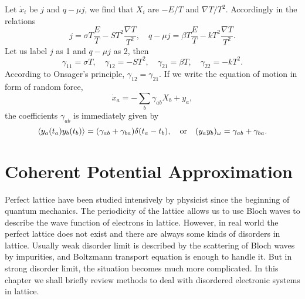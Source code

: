\documentclass{book}
\newcommand{\average}[1]{\langle#1\rangle}
\numberwithin{equation}{section}
\begin{document}
Let $\dot{x}_i$ be $j$ and $q-\mu j$, we find that $X_i$ are $-E/T$
and $\nabla T/T^2$. Accordingly in the relations
\begin{equation}
  j=\sigma T\frac{E}{T}-ST^2\frac{\nabla T}{T^2},\quad
  q-\mu j=\beta T\frac{E}{T}-kT^2\frac{\nabla T}{T^2}.
\end{equation}
Let us label $j$ as 1 and $q-\mu j$ as 2, then
\begin{equation}
  \gamma_{11}=\sigma T,\quad \gamma_{12}=-ST^2,\quad
  \gamma_{21}=\beta T,\quad \gamma_{22}=-kT^2.
\end{equation}
According to Onsager's principle, $\gamma_{12}=\gamma_{21}$.  If we
write the equation of motion in form of random force, 
\begin{equation}
  \dot{x}_a=-\sum_b\gamma_{ab}X_b+y_a,
\end{equation}
the coefficients $\gamma_{ab}$ is immediately given by
\begin{equation}
  \average{y_a(t_a)y_b(t_b)}=(\gamma_{ab}+\gamma_{ba})\delta(t_a-t_b),\quad
  {\rm or}\quad(y_ay_b)_\omega=\gamma_{ab}+\gamma_{ba}.
\end{equation}

\chapter{Coherent Potential Approximation}
Perfect lattice have been studied intensively by physicist since the
beginning of quantum mechanics. The periodicity of the lattice allows
us to use Bloch waves to describe the wave function of electrons in
lattice. However, in real world the perfect lattice does not exist and
there are always some kinds of disorders in lattice. Usually weak
disorder limit is described by the scattering of Bloch waves by
impurities, and Boltzmann transport equation is enough to handle
it. But in strong disorder limit, the situation becomes much more
complicated. In this chapter we shall briefly review methods to deal
with disordered electronic systems in lattice.
\end{document}
